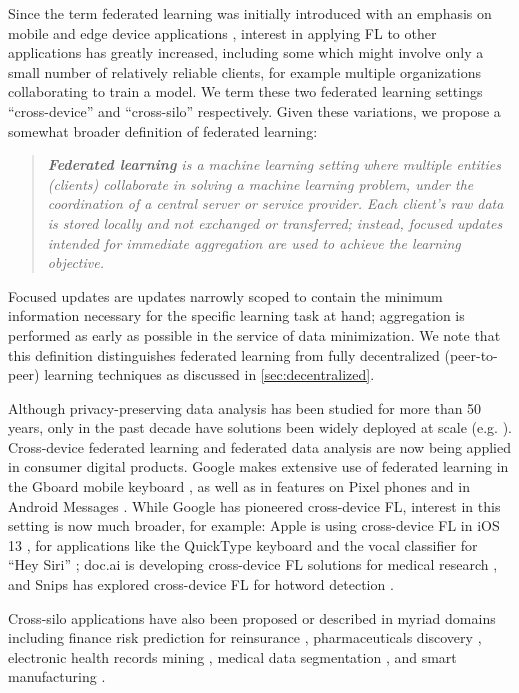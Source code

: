 \documentclass[11pt]{article}
\begin{document}
Since the term federated learning was initially introduced with an emphasis on mobile and edge device applications \citep{mcmahan17fedavg,flblog17}, interest in applying FL to other applications has greatly increased, including some which might involve only a small number of relatively reliable clients, for example multiple organizations collaborating to train a model. We term these two federated learning settings ``cross-device'' and  ``cross-silo'' respectively. Given these variations, we propose a somewhat broader definition of federated learning:
\begin{quote}
\emph{\textbf{Federated learning} is a machine learning setting where multiple entities (clients) collaborate in solving a machine learning problem, under the 
coordination of a central server or service provider. Each client's raw data is stored locally and not exchanged or transferred; instead, focused updates intended for immediate aggregation are used to achieve the learning objective.}
\end{quote}
Focused updates are updates narrowly scoped to contain the minimum information necessary for the specific learning task at hand; aggregation is performed as early as possible in the service of data minimization. We note that this definition distinguishes federated learning from fully decentralized (peer-to-peer) learning techniques as discussed in \cref{sec:decentralized}.

Although privacy-preserving data analysis has been studied for more than 50 years, only in the past decade have solutions been widely deployed at scale (e.g. \citep{rappor:15,applewhitepaper:17}). Cross-device federated learning and federated data analysis are now being applied in consumer digital products. Google makes extensive use of federated learning in the Gboard mobile keyboard \citep{sundar2019nyt,hard18gboard,yang18gboardquery,chen19oov,ramaswamy19emoji}, as well as in features on Pixel phones \citep{googleai18settingssearch} and in Android Messages \citep{messages19privacy}. While Google has pioneered cross-device FL, interest in this setting is now much broader, for example: Apple is using cross-device FL in iOS 13 \citep{apple19neurips}, for applications like the QuickType keyboard and the vocal classifier for ``Hey Siri'' \citep{apple19wwdc};  doc.ai is developing cross-device FL solutions for medical research \citep{docai}, and Snips has explored cross-device FL for hotword detection \citep{leroy2018federated}.

Cross-silo applications have also been proposed or described in myriad domains including finance risk prediction for reinsurance \citep{webankswissre19reinsurance}, pharmaceuticals discovery \citep{melloddy19pharma}, electronic health records mining \citep{featurecloud19ehr}, medical data segmentation \citep{intel19medicalimaging, courtiol2019deep}, and smart manufacturing \citep{musketeer19mfg}.
\end{document}
